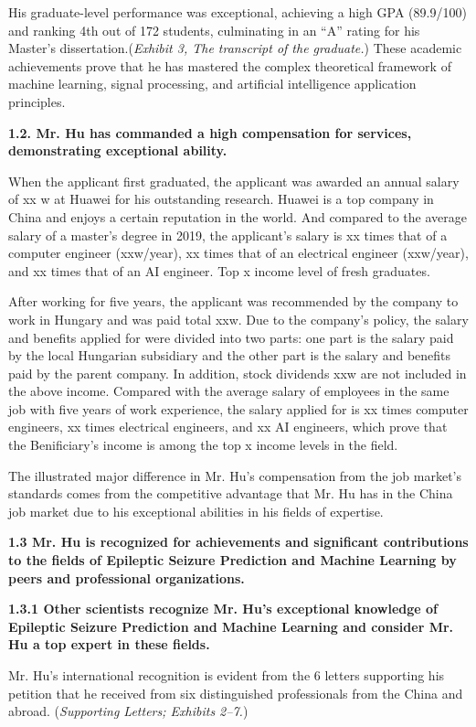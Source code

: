\documentclass{article}
\begin{document}
His graduate-level performance was exceptional, achieving a high GPA (89.9/100) and ranking 4th out of 172 students, culminating in an “A” rating for his Master’s dissertation.({\it Exhibit 3, The transcript of the graduate.}) These academic achievements prove that he has mastered the complex theoretical framework of machine learning, signal processing, and artificial intelligence application principles.


{\bf 1.2. Mr. Hu has commanded a high compensation for services, demonstrating exceptional ability. }

When the applicant first graduated, the applicant was awarded an annual salary of xx w at Huawei for his outstanding research. Huawei is a top company in China and enjoys a certain reputation in the world. And compared to the average salary of a master's degree in 2019, the applicant's salary is xx times that of a computer engineer (xxw/year), xx times that of an electrical engineer (xxw/year), and xx times that of an AI engineer. Top x income level of fresh graduates.

After working for five years, the applicant was recommended by the company to work in Hungary and was paid total xxw. Due to the company's policy, the salary and benefits applied for were divided into two parts: one part is the salary paid by the local Hungarian subsidiary and the other part is the salary and benefits paid by the parent company. In addition, stock dividends xxw are not included in the above income. Compared with the average salary of employees in the same job with five years of work experience, the salary applied for is xx times computer engineers, xx times electrical engineers, and xx AI engineers, which prove that the Benificiary's income is among the top x income levels in the field.

The illustrated major difference in Mr. Hu's compensation from the job market's standards comes from the competitive advantage that Mr. Hu has in the China job market due to his exceptional abilities in his fields of expertise. 

{\bf 1.3 Mr. Hu is recognized for achievements and significant contributions to the fields of Epileptic Seizure Prediction and Machine Learning by peers and professional organizations. }

{\bf 1.3.1 Other scientists recognize Mr. Hu’s exceptional knowledge of Epileptic Seizure Prediction and Machine Learning and consider Mr. Hu a top expert in these fields.}

Mr. Hu's international recognition is evident from the 6 letters supporting his petition that he received from six distinguished professionals from the China and abroad. ({\it Supporting Letters; Exhibits 2–7.}) 
\end{document}
